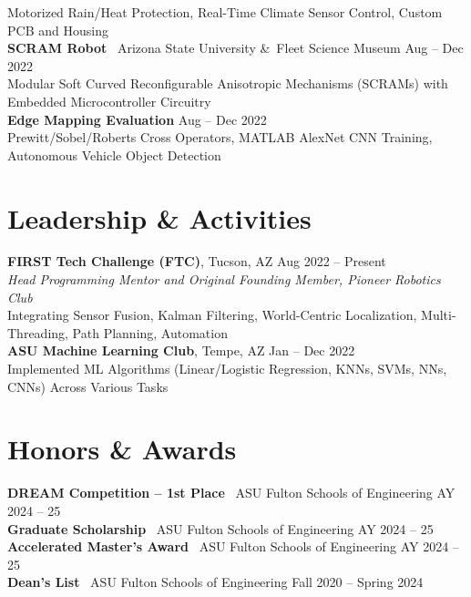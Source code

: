 \documentclass[10pt]{article}
\begin{document}
\hspace*{2em}Motorized Rain/Heat Protection, Real-Time Climate Sensor Control, Custom PCB and Housing
\\
\textbf{SCRAM Robot} \textbar\ Arizona State University \&\ Fleet Science Museum \hfill Aug -- Dec 2022 \\
\hspace*{2em}Modular Soft Curved Reconfigurable Anisotropic Mechanisms (SCRAMs) with Embedded Microcontroller Circuitry
\\
\textbf{Edge Mapping Evaluation} \hfill Aug -- Dec 2022 \\
\hspace*{2em}Prewitt/Sobel/Roberts Cross Operators, MATLAB AlexNet CNN Training, Autonomous Vehicle Object Detection

\section*{Leadership \& Activities}
\textbf{FIRST Tech Challenge (FTC)}, Tucson, AZ \hfill Aug 2022 -- Present \\
\textit{Head Programming Mentor and Original Founding Member, Pioneer Robotics Club}\\
\hspace*{2em}Integrating Sensor Fusion, Kalman Filtering, World-Centric Localization, Multi-Threading, Path Planning, Automation
\\
\textbf{ASU Machine Learning Club}, Tempe, AZ \hfill Jan -- Dec 2022 \\
\hspace*{2em}Implemented ML Algorithms (Linear/Logistic Regression, KNNs, SVMs, NNs, CNNs) Across Various Tasks

\section*{Honors \& Awards}
\textbf{DREAM Competition -- 1st Place} \textbar\ ASU Fulton Schools of Engineering \hfill AY 2024 -- 25 \\
\textbf{Graduate Scholarship} \textbar\ ASU Fulton Schools of Engineering \hfill AY 2024 -- 25 \\
\textbf{Accelerated Master's Award} \textbar\ ASU Fulton Schools of Engineering \hfill AY 2024 -- 25\\
\textbf{Dean's List} \textbar\ ASU Fulton Schools of Engineering \hfill Fall 2020 -- Spring 2024
\end{document}
